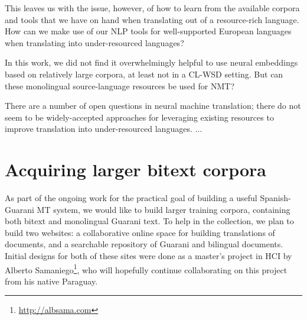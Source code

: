 This leaves us with the issue, however, of how to learn from the available
corpora and tools that we have on hand when translating out of a resource-rich
language. How can we make use of our NLP tools for well-supported European
languages when translating into under-resourced languages?

In this work, we did not find it overwhelmingly helpful to use neural
embeddings based on relatively large corpora, at least not in a CL-WSD setting.
But can these monolingual source-language resources be used for NMT?

There are a number of open questions in neural machine translation; there do
not seem to be widely-accepted approaches for leveraging existing resources to
improve translation into under-resourced languages. ... %





\section{Acquiring larger bitext corpora}
\label{sec:crowdsourcing}




As part of the ongoing work for the practical goal of building a useful
Spanish-Guarani MT system, we would like to build larger training corpora,
containing both bitext and monolingual Guarani text.
To help in the collection, we plan to build two websites:
a collaborative online space for building translations of documents, 
and a searchable repository of Guarani and bilingual documents.
Initial designs for both of these sites were done as a master's project in HCI
by Alberto Samaniego\footnote{\url{http://albsama.com}}, who will hopefully
continue collaborating on this project from his native Paraguay.


